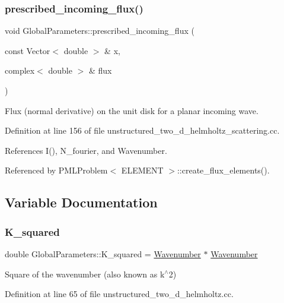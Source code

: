 \subsubsection{\texorpdfstring{prescribed\+\_\+incoming\+\_\+flux()}{prescribed\_incoming\_flux()}}
{\footnotesize\ttfamily void Global\+Parameters\+::prescribed\+\_\+incoming\+\_\+flux (\begin{DoxyParamCaption}\item[{const Vector$<$ double $>$ \&}]{x,  }\item[{complex$<$ double $>$ \&}]{flux }\end{DoxyParamCaption})}



Flux (normal derivative) on the unit disk for a planar incoming wave. 



Definition at line 156 of file unstructured\+\_\+two\+\_\+d\+\_\+helmholtz\+\_\+scattering.\+cc.



References I(), N\+\_\+fourier, and Wavenumber.



Referenced by P\+M\+L\+Problem$<$ E\+L\+E\+M\+E\+N\+T $>$\+::create\+\_\+flux\+\_\+elements().



\subsection{Variable Documentation}
\mbox{\label{namespaceGlobalParameters_aae73cb63b27d51a87845c3392cd944eb}} 
\subsubsection{\texorpdfstring{K\+\_\+squared}{K\_squared}}
{\footnotesize\ttfamily double Global\+Parameters\+::\+K\+\_\+squared = \hyperlink{namespaceGlobalParameters_a571b847702904d4cf646ac7ff17a7d2c}{Wavenumber} $\ast$ \hyperlink{namespaceGlobalParameters_a571b847702904d4cf646ac7ff17a7d2c}{Wavenumber}}



Square of the wavenumber (also known as k$^\wedge$2) 



Definition at line 65 of file unstructured\+\_\+two\+\_\+d\+\_\+helmholtz.\+cc.



